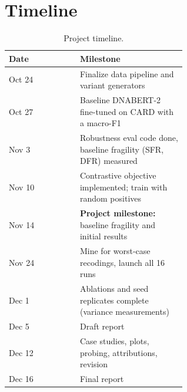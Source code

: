 \documentclass{article}
\newcommand{\todo}[1]{\textcolor{red}{[TODO: #1]}}
\begin{document}
\section{Timeline}
\label{sec:timeline}

\begin{table}[H]
  \caption{Project timeline.}
  \label{tab:timeline}
  \centering
  \small
  \begin{tabular}{lp{0.60\linewidth}}
    \toprule
    Date & Milestone \\
    \midrule
    Oct 24 & Finalize data pipeline and variant generators \\
    Oct 27 & Baseline DNABERT-2 fine-tuned on CARD with a macro-F1 \\
    Nov 3 & Robustness eval code done, baseline fragility (SFR, DFR) measured \\
    Nov 10 & Contrastive objective implemented; train with random positives \\
    Nov 14 & \textbf{Project milestone:} baseline fragility and initial results \\
    Nov 24 & Mine for worst-case recodings, launch all 16 runs \\
    Dec 1 & Ablations and seed replicates complete (variance measurements) \\
    Dec 5  & Draft report \\
    Dec 12 & Case studies, plots, probing, attributions, revision \\
    Dec 16 & Final report \\
    \bottomrule
  \end{tabular}
\end{table}







\end{document}
